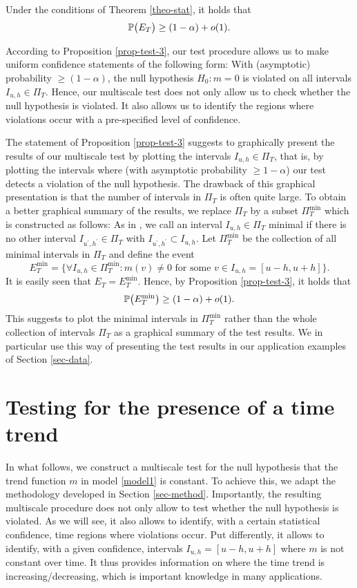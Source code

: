 \begin{prop}\label{prop-test-3}
Under the conditions of Theorem \ref{theo-stat}, it holds that  
\[ \mathbb{P} \big( E_T \big) \ge (1-\alpha) + o(1). \] 
\end{prop}
According to Proposition \ref{prop-test-3}, our test procedure allows us to make uniform confidence statements of the following form: With (asymptotic) probability $\ge (1-\alpha)$, the null hypothesis $H_0: m = 0$ is violated on all intervals $I_{u,h} \in \Pi_T$. Hence, our multiscale test does not only allow us to check whether the null hypothesis is violated. It also allows us to identify the regions where violations occur with a pre-specified level of confidence. 
 

The statement of Proposition \ref{prop-test-3} suggests to graphically present the results of our multiscale test by plotting the intervals $I_{u,h} \in \Pi_T$, that is, by plotting the intervals where (with asymptotic probability $\ge 1-\alpha$) our test detects a violation of the null hypothesis. The drawback of this graphical presentation is that the number of intervals in $\Pi_T$ is often quite large. To obtain a better graphical summary of the results, we replace $\Pi_T$ by a subset $\Pi_T^{\min}$ which is constructed as follows: As in \cite{Duembgen2002}, we call an interval $I_{u,h} \in \Pi_T$ minimal if there is no other interval $I_{u^\prime,h^\prime} \in \Pi_T$ with $I_{u^\prime,h^\prime} \subset I_{u,h}$. Let $\Pi_T^{\min}$ be the collection of all minimal intervals in $\Pi_T$ and define the event 
\[ E_T^{\min} = \Big\{ \forall I_{u,h} \in \Pi_T^{\min}: m(v) \ne 0 \text{ for some } v \in I_{u,h} = [u-h,u+h] \Big\}. \]
It is easily seen that $E_T = E_T^{\min}$. Hence, by Proposition \ref{prop-test-3}, it holds that
\[ \mathbb{P} \big( E_T^{\min} \big) \ge (1-\alpha) + o(1). \] 
This suggests to plot the minimal intervals in $\Pi_T^{\min}$ rather than the whole collection of intervals $\Pi_T$ as a graphical summary of the test results. We in particular use this way of presenting the test results in our application examples of Section \ref{sec-data}. 



\section{Testing for the presence of a time trend}\label{sec-test-shape}


In what follows, we construct a multiscale test for the null hypothesis that the trend function $m$ in model \eqref{model1} is constant. To achieve this, we adapt the methodology developed in Section \ref{sec-method}. Importantly, the resulting multiscale procedure does not only allow to test whether the null hypothesis is violated. As we will see, it also allows to identify, with a certain statistical confidence, time regions where violations occur. Put differently, it allows to identify, with a given confidence, intervals $I_{u,h} = [u-h,u+h]$ where $m$ is not constant over time.
It thus provides information on where the time trend is increasing/decreasing, which is important knowledge in many applications. 



